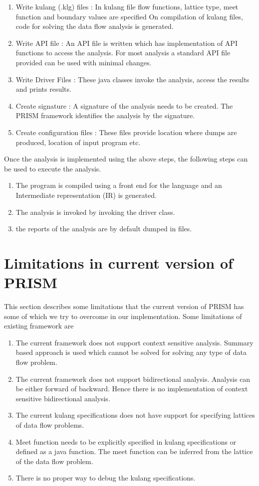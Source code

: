 \documentclass[12pt]{report}
\begin{document}
\begin{enumerate}
\item Write kulang (.klg) files : In kulang file flow functions, lattice type, meet function and boundary values are specified On compilation of kulang files, code for solving the data flow analysis is generated.
\item Write API file : An API file is written which has implementation of API functions to access the analysis. For most analysis a standard API file provided can be used with minimal changes.
\item Write Driver Files : These java classes invoke the analysis, access the results and prints results.
\item Create signature : A signature of the analysis needs to be created. The PRISM framework identifies the analysis by the signature.
\item Create configuration files : These files provide location where dumps are produced, location of input program etc. 
\end{enumerate}

Once the analysis is implemented using the above steps, the following steps can be used to execute the analysis.

\begin{enumerate}
\item The program is compiled using a front end for the language and an Intermediate representation (IR) is generated.
\item The analysis is invoked by invoking the driver class.
\item the reports of the analysis are by default dumped in files.
\end{enumerate}

\section{Limitations in current version of PRISM}
This section describes some limitations that the current version of PRISM has some of which we try to overcome in our implementation. Some limitations of existing framework are

\begin{enumerate}
\item The current framework does not support context sensitive analysis. Summary based approach is used which cannot be solved for solving any type of data flow problem.
\item The current framework does not support bidirectional analysis. Analysis can be either forward of backward. Hence there is no implementation of context sensitive bidirectional analysis.
\item The current kulang specifications does not have support for specifying lattices of data flow problems.
\item Meet function needs to be explicitly specified in kulang specifications or defined as a java function. The meet function can be inferred from the lattice of the data flow problem.
\item There is no proper way to debug the kulang specifications.
\end{enumerate}
\end{document}
